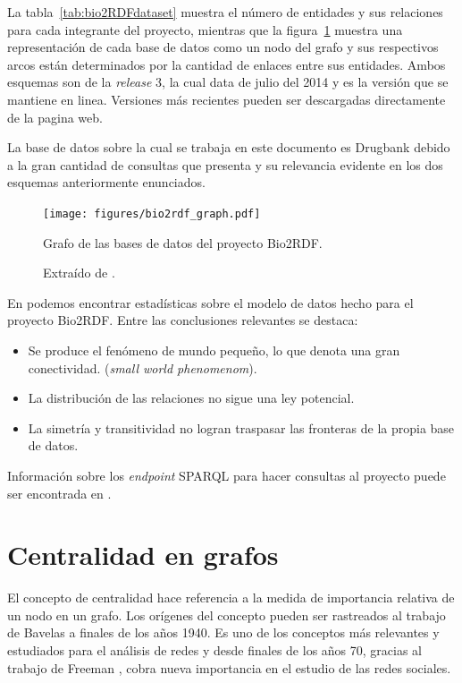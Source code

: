 La tabla~\ref{tab:bio2RDFdataset} muestra el número de entidades y sus
relaciones para cada integrante del proyecto, mientras que la
figura~\ref{fig:bio2rdfgraph} muestra una representación de cada
base de datos como un nodo del grafo y sus respectivos arcos están determinados
por la cantidad de enlaces entre sus entidades.
Ambos esquemas son de la \emph{release} 3, la cual data de julio del 2014 y es
la versión que se mantiene en linea.
Versiones más recientes pueden ser descargadas directamente de la pagina web.

La base de datos sobre la cual se trabaja en este documento es Drugbank debido a
la gran cantidad de consultas que presenta y su relevancia evidente en los dos
esquemas anteriormente enunciados.



\begin{figure}[htpb]
  \centering
  \texttt{[image: figures/bio2rdf\_graph.pdf]}
  \caption{Grafo de las bases de datos del proyecto Bio2RDF.}
  \vspace{-.3cm}
  \caption*{Extraído de \cite{hu2015link}.}
  \label{fig:bio2rdfgraph}
\end{figure}

En \cite{hu2015link} podemos encontrar estadísticas sobre el modelo de datos
hecho para el proyecto Bio2RDF. Entre las conclusiones relevantes se destaca:
\begin{itemize}
  \item
    Se produce el fenómeno de mundo pequeño, lo que denota una gran
    conectividad. (\emph{small world phenomenom}).
  \item
    La distribución de las relaciones no sigue una ley potencial.
  \item
    La simetría y transitividad no logran traspasar las fronteras de la propia
    base de datos.
\end{itemize}

Información sobre los \emph{endpoint} SPARQL para hacer consultas al proyecto
puede ser encontrada en \cite{callahan2013bio2rdf}.


\section{Centralidad en grafos}\label{ea:cent}
El concepto de centralidad hace referencia a la medida de importancia relativa
de un nodo en un grafo.
Los orígenes del concepto pueden ser rastreados al trabajo de Bavelas a finales
de los años 1940\cite{bavelas1948mathematical}.
Es uno de los conceptos más relevantes y estudiados para el análisis de redes y
desde finales de los años 70, gracias al trabajo de Freeman 
\etal\cite{freeman1979centrality,freeman1991centrality}, 
cobra nueva importancia en el estudio de las redes sociales.

